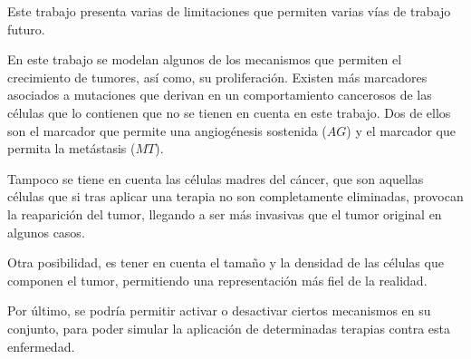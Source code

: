 Este trabajo presenta varias de limitaciones que permiten
varias vías de trabajo futuro.

En este trabajo se modelan algunos de los mecanismos que permiten
el crecimiento de tumores, así como, su proliferación. Existen más
marcadores asociados a mutaciones que derivan en un comportamiento cancerosos
de las células que lo contienen que no se tienen en cuenta en este
trabajo. Dos de ellos son el marcador que permite una angiogénesis
sostenida ($AG$) y el marcador que permita la metástasis ($MT$).

Tampoco se tiene en cuenta las células madres del cáncer, que son
aquellas células que si tras aplicar una terapia no son completamente
eliminadas, provocan la reaparición del tumor, llegando a ser más
invasivas que el tumor original en algunos casos.

Otra posibilidad, es tener en cuenta el tamaño y la densidad
de las células que componen el tumor, permitiendo una representación
más fiel de la realidad.

Por último, se podría permitir activar o desactivar ciertos mecanismos
en su conjunto, para poder simular la aplicación de determinadas terapias contra
esta enfermedad.
